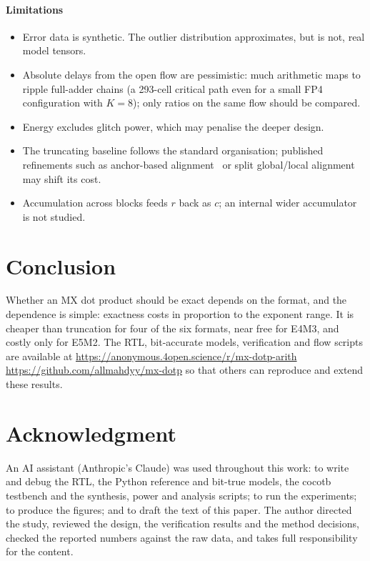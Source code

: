 \documentclass[conference,compsoc]{IEEEtran}
\begin{document}
\paragraph*{Limitations}
\begin{itemize}
  \item Error data is synthetic.  The outlier distribution approximates, but
        is not, real model tensors.
  \item Absolute delays from the open flow are pessimistic: much arithmetic
        maps to ripple full-adder chains (a 293-cell critical path even for
        a small FP4 configuration with $K=8$); only ratios on the same flow
        should be compared.
  \item Energy excludes glitch power, which may penalise the deeper design.
  \item The truncating baseline follows the standard organisation; published
        refinements such as anchor-based alignment~\cite{lutz2024fp8} or
        split global/local alignment~\cite{kaul2019dot} may shift its cost.
  \item Accumulation across blocks feeds $r$ back as $c$; an internal wider
        accumulator is not studied.
\end{itemize}

\section{Conclusion}
Whether an MX dot product should be exact depends on the format, and the
dependence is simple: exactness costs in proportion to the exponent range.
It is cheaper than truncation for four of the six formats, near free for
E4M3, and costly only for E5M2.  The RTL, bit-accurate models, verification
and flow scripts are available at
\ifdefined\ANON
\url{https://anonymous.4open.science/r/mx-dotp-arith}
\else
\url{https://github.com/allmahdyy/mx-dotp}
\fi
so that others can reproduce and extend these results.

\section*{Acknowledgment}
An AI assistant (Anthropic's Claude) was used throughout this work: to write
and debug the RTL, the Python reference and bit-true models, the cocotb
testbench and the synthesis, power and analysis scripts; to run the
experiments; to produce the figures; and to draft the text of this paper.
The author directed the study, reviewed the design, the verification
results and the method decisions, checked the reported numbers against the
raw data, and takes full responsibility for the content.



\end{document}
